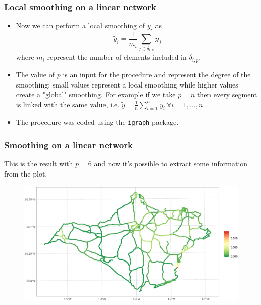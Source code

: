 \documentclass[c,10pt,pdftex]{beamer}
\begin{document}
\begin{frame}
\frametitle{Local smoothing on a linear network}
\vspace{-0.5cm}
\begin{itemize}
	\setlength\itemsep{1em}
	\item Now we can perform a \alert{local smoothing of $y_i$} as
	\[
	\tilde{y}_i = \frac{1}{m_i}\sum_{j \in \delta_{i, p}} y_{j} 
	\]
	where $m_i$ represent the number of elements included in $\delta_{i, p}$. 
	
	\item The value of $p$ is an input for the procedure and represent the degree of the smoothing: small values represent a local smoothing while higher values create a "global" smoothing. For example if we take $p = n$ then every segment is linked with the same value, i.e. $\tilde{y} = \frac{1}{n}\sum_{i=1}^{n}y_{i} \ \forall i = 1, \dots, n$. 
	
	\item The procedure was coded using the \texttt{igraph} package.
\end{itemize}
\end{frame}

\begin{frame}
\frametitle{Smoothing on a linear network}
\vspace{-0.25cm}
This is the result with $p = 6$ and now it's possible to extract some information from the plot. 
\begin{figure}
	\centering
	\includegraphics[width=\linewidth]{images/car_crashes_per_meter_smooth6}
\end{figure}
\end{frame}
\end{document}
